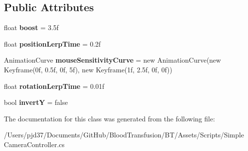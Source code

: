 \subsection*{Public Attributes}
\begin{DoxyCompactItemize}
\item 
float {\bfseries boost} = 3.\+5f\hypertarget{class_unity_template_projects_1_1_simple_camera_controller_a10837e7d6130729fa1a3aacf83e40f99}{}\label{class_unity_template_projects_1_1_simple_camera_controller_a10837e7d6130729fa1a3aacf83e40f99}

\item 
float {\bfseries position\+Lerp\+Time} = 0.\+2f\hypertarget{class_unity_template_projects_1_1_simple_camera_controller_a036fd7d0359c4010f5f1f667d782e429}{}\label{class_unity_template_projects_1_1_simple_camera_controller_a036fd7d0359c4010f5f1f667d782e429}

\item 
Animation\+Curve {\bfseries mouse\+Sensitivity\+Curve} = new Animation\+Curve(new Keyframe(0f, 0.\+5f, 0f, 5f), new Keyframe(1f, 2.\+5f, 0f, 0f))\hypertarget{class_unity_template_projects_1_1_simple_camera_controller_acc3108e7c3e9b684c44ea728c8177747}{}\label{class_unity_template_projects_1_1_simple_camera_controller_acc3108e7c3e9b684c44ea728c8177747}

\item 
float {\bfseries rotation\+Lerp\+Time} = 0.\+01f\hypertarget{class_unity_template_projects_1_1_simple_camera_controller_a4b8acc62cd20ada031234bdc9c612126}{}\label{class_unity_template_projects_1_1_simple_camera_controller_a4b8acc62cd20ada031234bdc9c612126}

\item 
bool {\bfseries invertY} = false\hypertarget{class_unity_template_projects_1_1_simple_camera_controller_ad51f554076f0f3c227a5b865f96c5ce5}{}\label{class_unity_template_projects_1_1_simple_camera_controller_ad51f554076f0f3c227a5b865f96c5ce5}

\end{DoxyCompactItemize}


The documentation for this class was generated from the following file\+:\begin{DoxyCompactItemize}
\item 
/\+Users/pjd37/\+Documents/\+Git\+Hub/\+Blood\+Transfusion/\+B\+T/\+Assets/\+Scripts/Simple\+Camera\+Controller.\+cs\end{DoxyCompactItemize}
